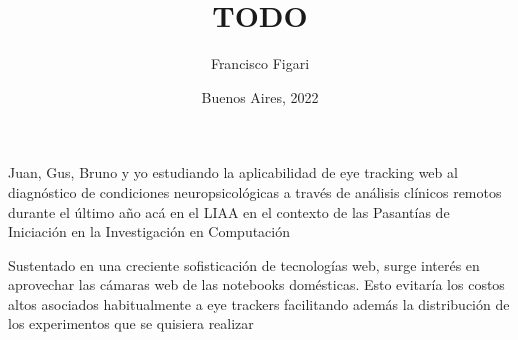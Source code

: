 \documentclass{beamer}
\title{TODO}
\author{Francisco Figari}
\date{Buenos Aires, 2022}
\begin{document}
\frame{\titlepage}


Juan, Gus, Bruno y yo
estudiando
  la aplicabilidad de eye tracking web
  al diagnóstico de condiciones neuropsicológicas
  a través de análisis clínicos remotos
durante el último año
acá
  en el LIAA
  en el contexto de las Pasantías de Iniciación en la Investigación en Computación

Sustentado en una creciente sofisticación de tecnologías web,
surge interés en aprovechar las cámaras web de las notebooks domésticas.
Esto evitaría los costos altos asociados habitualmente a eye trackers
facilitando además la distribución de los experimentos que se quisiera realizar


% 
% 
% 
% 
% 
% 
% 
% 
% 
% 
\end{document}
